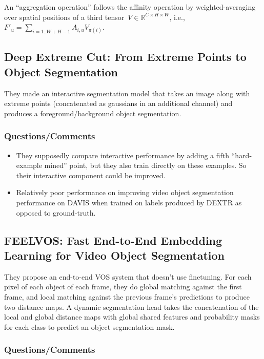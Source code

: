 \documentclass[a4paper, 12pt]{article}
\begin{document}
An ``aggregation operation'' follows the affinity operation by
weighted-averaging over spatial positions of a third
tensor~$V\in \mathbb{R}^{C\times H\times W}$,
i.e.,~$F'_u = \sum_{i = 1..W + H -1 }A_{i, u}V_{\pi(i)}$.


\subsection{Deep Extreme Cut: From Extreme Points to Object
            Segmentation~\cite{maninis2018deep}}

They made an interactive segmentation model that takes an image along with
extreme points (concatenated as gaussians in an additional channel) and
produces a foreground/background object segmentation.


\subsubsection{Questions/Comments}

\begin{itemize}
        \item They supposedly compare interactive performance by adding a fifth
                ``hard-example mined'' point, but they also train directly on
                these examples.
                So their interactive component could be improved.

        \item Relatively poor performance on improving video object
                segmentation performance on DAVIS when trained on labels
                produced by DEXTR as opposed to ground-truth.
\end{itemize}


\subsection{FEELVOS: Fast End-to-End Embedding Learning for Video Object
            Segmentation~\cite{feelvos2019}}

They propose an end-to-end VOS system that doesn't use finetuning.
For each pixel of each object of each frame, they do global matching against
the first frame, and local matching against the previous frame's predictions to
produce two distance maps.
A dynamic segmentation head takes the concatenation of the local and global
distance maps with global shared features and probability masks for each class
to predict an object segmentation mask.


\subsubsection{Questions/Comments}
\end{document}
